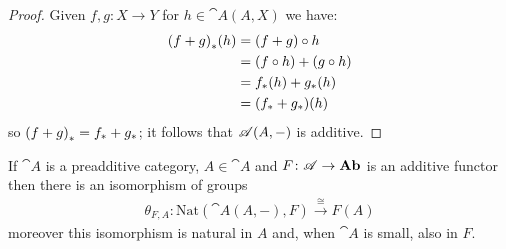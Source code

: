 \begin{proof}
  Given \(f,g\colon X\to Y\) for \(h\in\cat{A}(A, X)\) we have:
  \begin{align*}
    {(f+g)}_*(h) &= (f + g)\circ h\\
                        &= (f\circ h) + (g\circ h)\\
                        &= {f}_*(h) + {g}_*(h)\\
                        &= ({f}_* + {g}_*)(h)
  \end{align*}
  so \({(f + g)}_* = {f}_* + {g}_*\); it follows that \({\mathscr A}(A,-)\) is additive.
\end{proof}

\begin{lemma}
  \label{lemma:additive_yoneda_lemma}
  If \(\cat{A}\) is a preadditive category, \(A\in\cat{A}\) and \(F\colon{\mathscr A}\to\text{\normalfont\textbf{Ab}}\) is an additive functor then there is an isomorphism of groups
  \begin{gather*}
    \theta_{F,A}\colon\text{Nat}(\cat{A}(A,-),F)\overset{\cong}{\longrightarrow}F(A)
  \end{gather*}
  moreover this isomorphism is natural in \(A\) and, when \(\cat{A}\) is small, also in \(F\).
\end{lemma}

